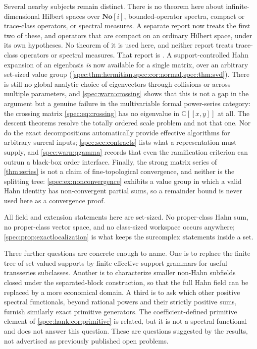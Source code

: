 \documentclass[11pt,a4paper]{article}
\numberwithin{equation}{section}
\theoremstyle{definition}
\theoremstyle{remark}
\newcommand{\SC}{\mathbf{No}[i]}
\newcommand{\C}{\mathbb C}
\begin{document}
Several nearby subjects remain distinct. There is no theorem here about
infinite-dimensional Hilbert spaces over $\SC$, bounded-operator spectra,
compact or trace-class operators, or spectral measures. A separate report
now treats the first two of these, and operators that are compact on an
ordinary Hilbert space, under its own hypotheses. No theorem of it is used
here, and neither report treats trace-class operators or spectral measures.
That report is
. A support-controlled
Hahn expansion of an eigenbasis \emph{is} now available for a single matrix,
over an arbitrary set-sized value group
(\cref{spec:thm:hermitian,spec:cor:normal,spec:thm:svd}). There is still no
global analytic choice of eigenvectors through collisions or across multiple
parameters, and \cref{spec:warn:crossing} shows that this is not a gap in
the argument but a genuine failure in the multivariable formal
power-series category: the crossing matrix \eqref{spec:eq:crossing} has no
eigenvalue in $\C[[x,y]]$ at all. The descent theorems resolve the totally
ordered scale problem and not that one. Nor do the exact decompositions
automatically provide effective algorithms for arbitrary surreal inputs;
\cref{spec:sec:contracts} lists what a representation must supply, and
\cref{spec:warn:qgamma} records that even the ramification criterion can
outrun a black-box order interface. Finally, the strong matrix series of
\cref{thm:series} is not a claim of fine-topological convergence, and
neither is the splitting tree: \cref{spec:ex:nonconvergence} exhibits a
value group in which a valid Hahn identity has non-convergent partial sums,
so a remainder bound is never used here as a convergence proof.

All field and extension statements here are set-sized. No proper-class Hahn
sum, no proper-class vector space, and no class-sized workspace occurs
anywhere; \cref{spec:prop:exactlocalization} is what keeps the surcomplex
statements inside a set.

Three further questions are concrete enough to name. One is to replace the
finite tree of set-valued supports by finite effective support grammars for
useful transseries subclasses. Another is to characterize smaller non-Hahn
subfields closed under the separated-block construction, so that the full
Hahn field can be replaced by a more economical domain. A third is to ask
which other positive spectral functionals, beyond rational powers and their
strictly positive sums, furnish similarly exact primitive generators. The
coefficient-defined primitive element of \cref{spec:hank:cor:primitive} is
related, but it is not a spectral functional and does not answer this
question. These are questions suggested by the results, not advertised as
previously published open problems.
\end{document}

